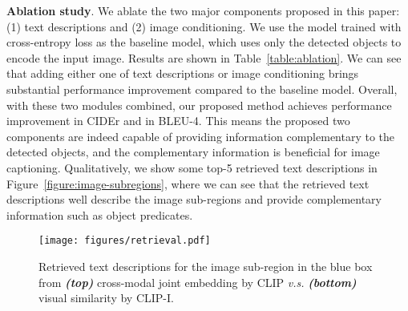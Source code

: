 \documentclass[10pt,twocolumn,letterpaper]{article}
\begin{document}
\begin{table}
\centering
\renewcommand{\arraystretch}{1.2}
\caption{
Ablation study for the proposed text descriptions (denoted as \textit{Text}) and image conditioning (denoted as \textit{Image}).
The first row without \textit{Text} and \textit{Image} corresponds to the baseline model using only detected objects for encoding the input image.
}
\label{table:ablation}
\end{table} 
\textbf{Ablation study}. We ablate the two major components proposed in this paper: (1) text descriptions and (2) image conditioning.
We use the  model trained with cross-entropy loss as the baseline model, which uses only the detected objects to encode the input image.
Results are shown in Table~\ref{table:ablation}.
We can see that adding either one of text descriptions or image conditioning brings substantial performance improvement compared to the baseline model.
Overall, with these two modules combined, our proposed method achieves  performance improvement in CIDEr and  in BLEU-4.
This means the proposed two components are indeed capable of providing information complementary to the detected objects, and the complementary information is beneficial for image captioning.
Qualitatively, we show some top-5 retrieved text descriptions in Figure~\ref{figure:image-subregions}, where we can see that the retrieved text descriptions well describe the image sub-regions and provide complementary information such as object predicates.






\begin{figure}
\centering
\texttt{[image: figures/retrieval.pdf]}
\caption{
Retrieved text descriptions for the image sub-region in the blue box from \textit{\textbf{(top)}} cross-modal joint embedding by CLIP \textit{v.s.} \textit{\textbf{(bottom)}} visual similarity by CLIP-I.
}
\label{figure:retrieval}
\end{figure}
\end{document}

